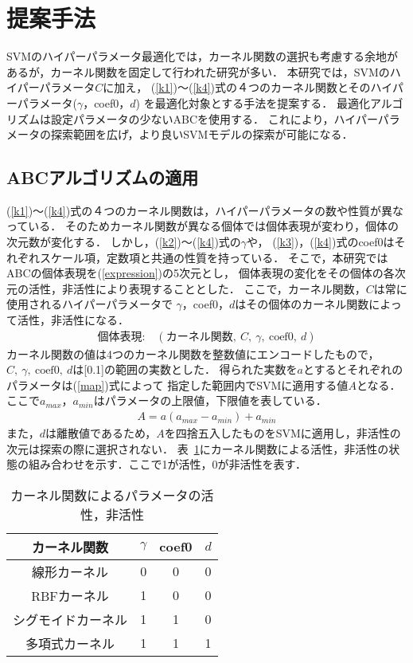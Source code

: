 \section{提案手法}
SVMのハイパーパラメータ最適化では，カーネル関数の選択も考慮する余地があるが，カーネル関数を固定して行われた研究が多い．
本研究では，SVMのハイパーパラメータ$C$に加え，
(\ref{k1})〜(\ref{k4})式の４つのカーネル関数とそのハイパーパラメータ($\gamma$，coef0，$d$)
を最適化対象とする手法を提案する．
最適化アルゴリズムは設定パラメータの少ないABCを使用する．
これにより，ハイパーパラメータの探索範囲を広げ，より良いSVMモデルの探索が可能になる．
\subsection{ABCアルゴリズムの適用}
(\ref{k1})〜(\ref{k4})式の４つのカーネル関数は，ハイパーパラメータの数や性質が異なっている．
そのためカーネル関数が異なる個体では個体表現が変わり，個体の次元数が変化する．
しかし，(\ref{k2})〜(\ref{k4})式の$\gamma$や，
(\ref{k3})，(\ref{k4})式のcoef0はそれぞれスケール項，定数項と共通の性質を持っている．
そこで，本研究ではABCの個体表現を(\ref{expression})の5次元とし，
個体表現の変化をその個体の各次元の活性，非活性により表現することとした．
ここで，カーネル関数，$C$は常に使用されるハイパーパラメータで
$\gamma$，coef0，$d$はその個体のカーネル関数によって活性，非活性になる．
\begin{align}
    \text{個体表現:} \quad  (\text{カーネル関数},~C,~\gamma,~\text{coef0},~d)\label{expression}
\end{align}
カーネル関数の値は4つのカーネル関数を整数値にエンコードしたもので，
$C,~\gamma,~\text{coef0},~d$は[0.1]の範囲の実数とした．
得られた実数を$a$とするとそれぞれのパラメータは(\ref{map})式によって
指定した範囲内でSVMに適用する値$A$となる\cite{origin}．
ここで$a_{max}$，$a_{min}$はパラメータの上限値，下限値を表している．
\begin{align}
    \label{map}
    A =a(a_{max} -a_{min}) + a_{min}
\end{align}
また，$d$は離散値であるため，$A$を四捨五入したものをSVMに適用し，非活性の次元は探索の際に選択されない．
表~\ref{tab:param}にカーネル関数による活性，非活性の状態の組み合わせを示す．ここで1が活性，0が非活性を表す．
\begin{table}[t]
    \centering
    \caption{カーネル関数によるパラメータの活性，非活性}  %
    \begin{tabular}{|c|c|c|c|}  %
        \hline  %
        カーネル関数 & $\gamma$ & coef0 & $d$\\  %
        \hline  %
        線形カーネル& 0& 0& 0\\  %
        \hline  %
        RBFカーネル & 1 & 0& 0\\  %
        \hline  %
        シグモイドカーネル & 1 & 1& 0\\  %
        \hline  %
        多項式カーネル & 1 & 1& 1\\  %
        \hline  %
    \end{tabular}
    
    \label{tab:param}  %
  \end{table} %
  
